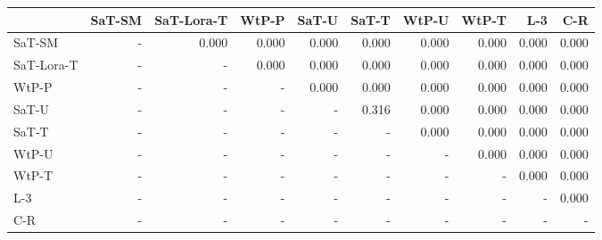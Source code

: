 \begin{tabular}{lrrrrrrrrr}
\toprule
 & SaT-SM & SaT-Lora-T & WtP-P & SaT-U & SaT-T & WtP-U & WtP-T & L-3 & C-R \\
\midrule
SaT-SM & - & 0.000 & 0.000 & 0.000 & 0.000 & 0.000 & 0.000 & 0.000 & 0.000 \\
SaT-Lora-T & - & - & 0.000 & 0.000 & 0.000 & 0.000 & 0.000 & 0.000 & 0.000 \\
WtP-P & - & - & - & 0.000 & 0.000 & 0.000 & 0.000 & 0.000 & 0.000 \\
SaT-U & - & - & - & - & 0.316 & 0.000 & 0.000 & 0.000 & 0.000 \\
SaT-T & - & - & - & - & - & 0.000 & 0.000 & 0.000 & 0.000 \\
WtP-U & - & - & - & - & - & - & 0.000 & 0.000 & 0.000 \\
WtP-T & - & - & - & - & - & - & - & 0.000 & 0.000 \\
L-3 & - & - & - & - & - & - & - & - & 0.000 \\
C-R & - & - & - & - & - & - & - & - & - \\
\bottomrule
\end{tabular}

